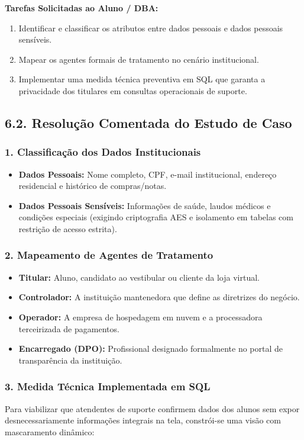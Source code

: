 \textbf{Tarefas Solicitadas ao Aluno / DBA:}
\begin{enumerate}
    \item Identificar e classificar os atributos entre dados pessoais e dados pessoais sensíveis.
    \item Mapear os agentes formais de tratamento no cenário institucional.
    \item Implementar uma medida técnica preventiva em SQL que garanta a privacidade dos titulares em consultas operacionais de suporte.
\end{enumerate}

\subsection*{6.2. Resolução Comentada do Estudo de Caso}

\subsubsection*{1. Classificação dos Dados Institucionais}
\begin{itemize}
    \item \textbf{Dados Pessoais:} Nome completo, CPF, e-mail institucional, endereço residencial e histórico de compras/notas.
    \item \textbf{Dados Pessoais Sensíveis:} Informações de saúde, laudos médicos e condições especiais (exigindo criptografia AES e isolamento em tabelas com restrição de acesso estrita).
\end{itemize}

\subsubsection*{2. Mapeamento de Agentes de Tratamento}
\begin{itemize}
    \item \textbf{Titular:} Aluno, candidato ao vestibular ou cliente da loja virtual.
    \item \textbf{Controlador:} A instituição mantenedora que define as diretrizes do negócio.
    \item \textbf{Operador:} A empresa de hospedagem em nuvem e a processadora terceirizada de pagamentos.
    \item \textbf{Encarregado (DPO):} Profissional designado formalmente no portal de transparência da instituição.
\end{itemize}

\subsubsection*{3. Medida Técnica Implementada em SQL}
Para viabilizar que atendentes de suporte confirmem dados dos alunos sem expor desnecessariamente informações integrais na tela, constrói-se uma visão com mascaramento dinâmico:

